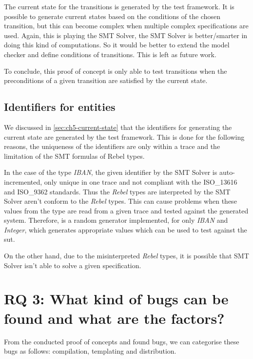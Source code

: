 The current state for the transitions is generated by the test framework. It is possible to generate current states based on the conditions of the chosen transition, but this can become complex when multiple complex specifications are used. Again, this is playing the SMT Solver, the SMT Solver is better/smarter in doing this kind of computations. So it would be better to extend the model checker and define conditions of transitions. This is left as future work.

To conclude, this proof of concept is only able to test transitions when the preconditions of a given transition are satisfied by the current state.


\subsection{Identifiers for entities}
We discussed in \autoref{sec:ch5-current-state} that the identifiers for generating the current state are generated by the test framework. This is done for the following reasons, the uniqueness of the identifiers are only within a trace and the limitation of the SMT formulas of Rebel types.

In the case of the type \textit{IBAN}, the given identifier by the SMT Solver is auto-incremented, only unique in one trace and not compliant with the ISO\_13616 and ISO\_9362 standards. Thus the \textit{Rebel} types are interpreted by the SMT Solver aren't conform to the \textit{Rebel} types. This can cause problems when these values from the type are read from a given trace and tested against the generated system. Therefore, is a random generator implemented, for only \textit{IBAN} and \textit{Integer}, which generates appropriate values which can be used to test against the \gls{sut}.

On the other hand, due to the misinterpreted \textit{Rebel} types, it is possible that SMT Solver isn't able to solve a given specification.


\section{RQ 3: What kind of bugs can be found and what are the factors?}

From the conducted proof of concepts and found bugs, we can categorise these bugs as follows: compilation, templating and distribution.

